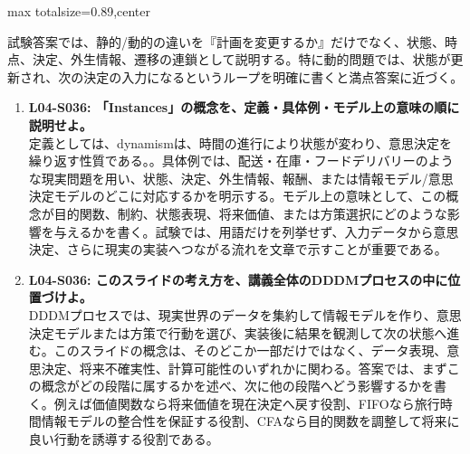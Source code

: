 \begin{minipage}[t]{0.58\textwidth}
\begin{adjustbox}{max totalsize={\textwidth}{0.89\textheight},center}
\begin{minipage}{\textwidth}
試験答案では、静的/動的の違いを『計画を変更するか』だけでなく、状態、時点、決定、外生情報、遷移の連鎖として説明する。特に動的問題では、状態が更新され、次の決定の入力になるというループを明確に書くと満点答案に近づく。\par{}\begin{enumerate}\item \textbf{L04-S036: 「Instances」の概念を、定義・具体例・モデル上の意味の順に説明せよ。}\\定義としては、dynamismは、時間の進行により状態が変わり、意思決定を繰り返す性質である。。具体例では、配送・在庫・フードデリバリーのような現実問題を用い、状態、決定、外生情報、報酬、または情報モデル/意思決定モデルのどこに対応するかを明示する。モデル上の意味として、この概念が目的関数、制約、状態表現、将来価値、または方策選択にどのような影響を与えるかを書く。試験では、用語だけを列挙せず、入力データから意思決定、さらに現実の実装へつながる流れを文章で示すことが重要である。\item \textbf{L04-S036: このスライドの考え方を、講義全体のDDDMプロセスの中に位置づけよ。}\\DDDMプロセスでは、現実世界のデータを集約して情報モデルを作り、意思決定モデルまたは方策で行動を選び、実装後に結果を観測して次の状態へ進む。このスライドの概念は、そのどこか一部だけではなく、データ表現、意思決定、将来不確実性、計算可能性のいずれかに関わる。答案では、まずこの概念がどの段階に属するかを述べ、次に他の段階へどう影響するかを書く。例えば価値関数なら将来価値を現在決定へ戻す役割、FIFOなら旅行時間情報モデルの整合性を保証する役割、CFAなら目的関数を調整して将来に良い行動を誘導する役割である。\end{enumerate}
\end{minipage}
\end{adjustbox}
\end{minipage}



